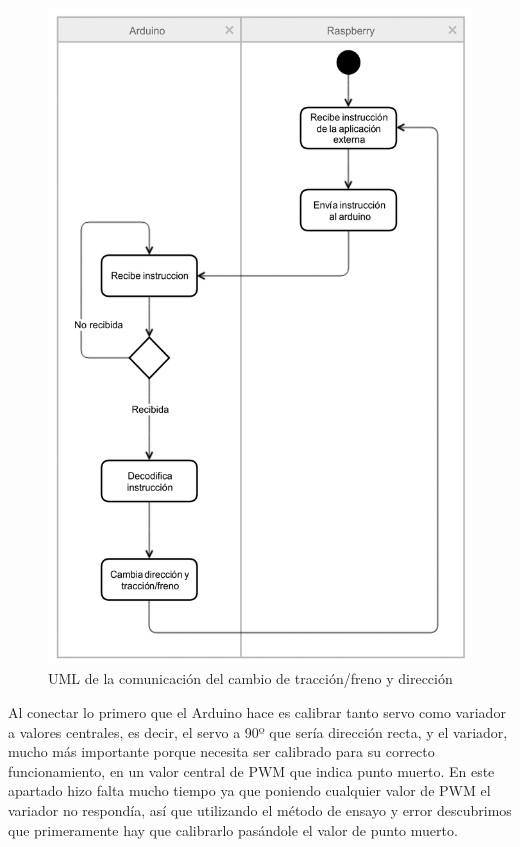 \documentclass{pclass}
\begin{document}
\begin{itemize}
\begin{itemize}
	\begin{figure}[H]
		\centering
		\includegraphics[width=1\textwidth]{img/umlCambio}
		\caption{UML de la comunicación del cambio de tracción/freno y dirección}
		\label{fig:arduinoCambios}
	\end{figure}
	
	Al conectar lo primero que el Arduino hace es calibrar tanto servo como variador a valores centrales, es decir, el servo a 90º que sería dirección recta, y el variador, mucho más importante porque necesita ser calibrado para su correcto funcionamiento, en un valor central de PWM que indica punto muerto. En este apartado hizo falta mucho tiempo ya que poniendo cualquier valor de PWM el variador no respondía, así que utilizando el método de ensayo y error descubrimos que primeramente hay que calibrarlo pasándole el valor de punto muerto.
	

\end{itemize}
\end{itemize}
\end{document}
